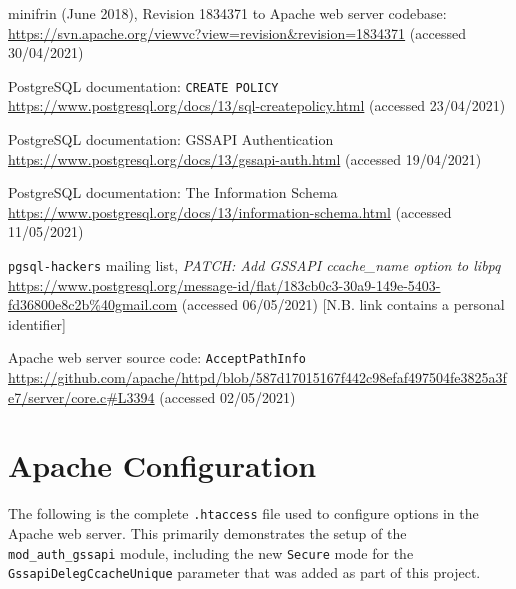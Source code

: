 \documentclass[12pt]{report}
\begin{document}
\begin{thebibliography}{99}
 minifrin (June 2018), Revision 1834371 to Apache web server codebase: \url{https://svn.apache.org/viewvc?view=revision&revision=1834371} (accessed 30/04/2021)

 PostgreSQL documentation: \texttt{CREATE POLICY} \url{https://www.postgresql.org/docs/13/sql-createpolicy.html} (accessed 23/04/2021)

 PostgreSQL documentation: GSSAPI Authentication \url{https://www.postgresql.org/docs/13/gssapi-auth.html} (accessed 19/04/2021)

 PostgreSQL documentation: The Information Schema \url{https://www.postgresql.org/docs/13/information-schema.html} (accessed 11/05/2021)

 \texttt{pgsql-hackers} mailing list, \textit{PATCH: Add GSSAPI ccache\_name option to libpq} \url{https://www.postgresql.org/message-id/flat/183cb0c3-30a9-149e-5403-fd36800e8c2b%40gmail.com} (accessed 06/05/2021) [N.B. link contains a personal identifier]

 Apache web server source code: \texttt{AcceptPathInfo} \url{https://github.com/apache/httpd/blob/587d17015167f442c98efaf497504fe3825a3fe7/server/core.c#L3394} (accessed 02/05/2021)


\end{thebibliography}

\appendix
\chapter{Apache Configuration}
\label{sec:appendix1}
The following is the complete \verb+.htaccess+ file used to configure options in the Apache web server. This primarily demonstrates the setup of the \verb+mod_auth_gssapi+ module, including the new \texttt{Secure} mode for the \texttt{GssapiDelegCcacheUnique} parameter that was added as part of this project.
\end{document}
